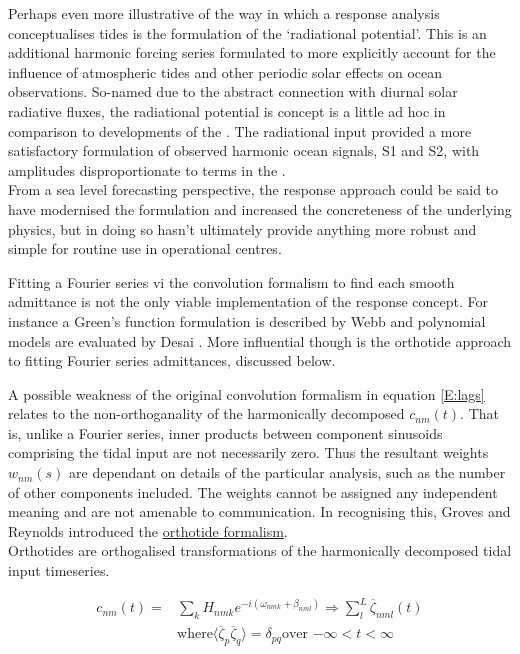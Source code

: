 Perhaps even more illustrative of the way in which a response analysis conceptualises tides is the formulation of the `radiational potential'.   This is an additional harmonic forcing series formulated to more explicitly account for the influence of atmospheric tides and other periodic solar effects on ocean observations.	  So-named due to the abstract connection with diurnal solar radiative fluxes, the radiational potential is concept is a little ad hoc in comparison to developments of the \ATGP{}.  The radiational input provided a more satisfactory formulation of observed harmonic ocean signals, S1 and S2, with amplitudes disproportionate to terms in the \ATGP{}.\\
From a sea level forecasting perspective, the response approach could be said to have modernised the formulation and increased the concreteness of the underlying physics, but in doing so hasn't ultimately provide anything more robust and simple for routine use in operational centres.




Fitting a Fourier series vi the convolution formalism to find each smooth admittance is not the only viable implementation of the response concept.  For instance a Green's function formulation is described by Webb\cite{Webb:1974ke} and polynomial models are evaluated by Desai \cite{Desai:1995je}. More influential though is the orthotide approach to fitting Fourier series admittances, discussed below.




A possible weakness of the original convolution formalism in equation \ref{E:lags} relates to the non-orthoganality of the harmonically decomposed $c_{nm}(t)$.  That is, unlike a Fourier series, inner products between component sinusoids comprising the tidal input are not necessarily zero.   Thus the resultant weights $w_{nm}(s)$ are dependant on details of the particular analysis, such as the number of other components included.  The weights cannot be assigned any independent meaning and are not amenable to communication.  In recognising this, Groves and Reynolds \citep {Groves:1975ky} introduced the \underline{orthotide formalism}.\\
Orthotides are orthogalised transformations of the harmonically decomposed tidal input timeseries.

\begin{align}
c_{nm}(t) =  &\sum_{k} H_{nmk} e^{-i(\omega_{nmk} + \beta_{nml})}  \Rightarrow \sum_{l}^L \overline{\zeta}_{nml}(t)     \nonumber \\
             &\mbox{where} \langle \overline{\zeta}_p \overline{\zeta}_q \rangle  = \delta_{pq}  \mbox{over $-\infty < t < \infty$}             \nonumber
\end{align}

